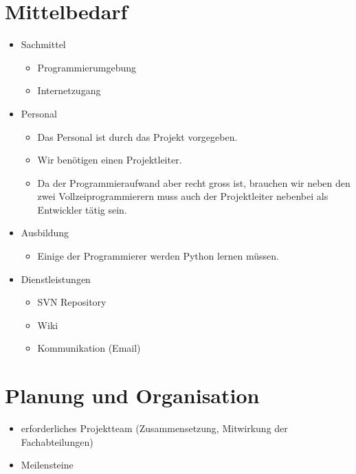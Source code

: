 \documentclass[10pt,paper=a4,final]{scrartcl}
\begin{document}
\section{Mittelbedarf}
\begin{itemize}
  \item Sachmittel
    \begin{itemize}
      \item Programmierumgebung
      \item Internetzugang
    \end{itemize}
  \item Personal
    \begin{itemize}
      \item Das Personal ist durch das Projekt vorgegeben.
      \item Wir benötigen einen Projektleiter.
      \item Da der Programmieraufwand aber recht gross ist, brauchen wir neben den zwei Vollzeiprogrammierern muss auch der Projektleiter nebenbei als Entwickler tätig sein.
    \end{itemize}
  \item Ausbildung
    \begin{itemize}
      \item Einige der Programmierer werden Python lernen müssen.
    \end{itemize}
  \item Dienstleistungen
    \begin{itemize}
	\item SVN Repository
	\item Wiki
	\item Kommunikation (Email)
    \end{itemize}
\end{itemize}
\section{Planung und Organisation}
\begin{itemize}
  \item erforderliches Projektteam (Zusammensetzung, Mitwirkung der Fachabteilungen)
  \item Meilensteine
\end{itemize}
\end{document}
